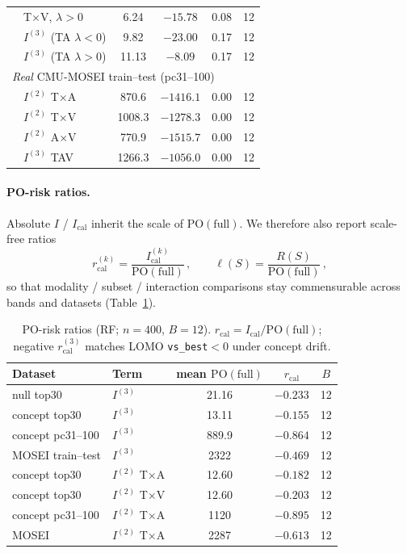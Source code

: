 \begin{table}[t]
\begin{tabular}{llcccc}
 & T$\times$V, $\lambda{>}0$ & 6.24 & $-15.78$ & 0.08 & 12 \\
 & $I^{(3)}$ (TA $\lambda{<}0$) & 9.82 & $-23.00$ & 0.17 & 12 \\
 & $I^{(3)}$ (TA $\lambda{>}0$) & 11.13 & $-8.09$ & 0.17 & 12 \\
\midrule
\multicolumn{6}{l}{\emph{Real} CMU-MOSEI train--test (pc31--100)} \\
 & $I^{(2)}$ T$\times$A & 870.6 & $-1416.1$ & 0.00 & 12 \\
 & $I^{(2)}$ T$\times$V & 1008.3 & $-1278.3$ & 0.00 & 12 \\
 & $I^{(2)}$ A$\times$V & 770.9 & $-1515.7$ & 0.00 & 12 \\
 & $I^{(3)}$ TAV & 1266.3 & $-1056.0$ & 0.00 & 12 \\
\bottomrule
\end{tabular}
\end{table}

\paragraph{PO-risk ratios.}
Absolute $I$ / $I_{\mathrm{cal}}$ inherit the scale of $\mathrm{PO}(\mathrm{full})$.
We therefore also report scale-free ratios
\begin{equation}
\label{eq:po-ratio}
r_{\mathrm{cal}}^{(k)}
=
\frac{I_{\mathrm{cal}}^{(k)}}{\mathrm{PO}(\mathrm{full})}
\,,\qquad
\ell(S)
=
\frac{R(S)}{\mathrm{PO}(\mathrm{full})}\,,
\end{equation}
so that modality / subset / interaction comparisons stay commensurable across
bands and datasets (Table~\ref{tab:po-ratios}).

\begin{table}[t]
\centering
\scriptsize
\setlength{\tabcolsep}{3pt}
\renewcommand{\arraystretch}{1.05}
\caption{PO-risk ratios (RF; $n{=}400$, $B{=}12$).
$r_{\mathrm{cal}}=I_{\mathrm{cal}}/\mathrm{PO}(\mathrm{full})$;
negative $r_{\mathrm{cal}}^{(3)}$ matches LOMO \texttt{vs\_best}$<0$ under concept drift.}
\label{tab:po-ratios}
\begin{tabular}{llccc}
\toprule
Dataset & Term & mean $\mathrm{PO}(\mathrm{full})$ & $r_{\mathrm{cal}}$ & $B$ \\
\midrule
null top30 & $I^{(3)}$ & 21.16 & $-0.233$ & 12 \\
concept top30 & $I^{(3)}$ & 13.11 & $-0.155$ & 12 \\
concept pc31--100 & $I^{(3)}$ & 889.9 & $-0.864$ & 12 \\
MOSEI train--test & $I^{(3)}$ & 2322 & $-0.469$ & 12 \\
\midrule
concept top30 & $I^{(2)}$ T$\times$A & 12.60 & $-0.182$ & 12 \\
concept top30 & $I^{(2)}$ T$\times$V & 12.60 & $-0.203$ & 12 \\
concept pc31--100 & $I^{(2)}$ T$\times$A & 1120 & $-0.895$ & 12 \\
MOSEI & $I^{(2)}$ T$\times$A & 2287 & $-0.613$ & 12 \\
\bottomrule
\end{tabular}
\end{table}

